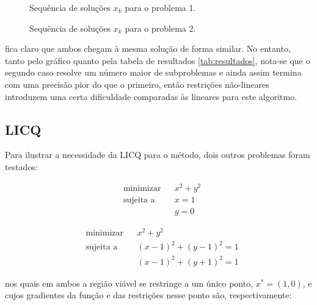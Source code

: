 	\noindent\begin{figure}[h!]
		\noindent\begin{minipage}[l]{.45\linewidth}
			\scalebox{.7}{}
			\caption{Sequência de soluções $x_k$ para o problema 1.}
		\end{minipage}%
		\hspace{0.1\linewidth}%
		\begin{minipage}[l]{.45\linewidth}
			\scalebox{.7}{}
			\caption{Sequência de soluções $x_k$ para o problema 2.}
		\end{minipage}
	\end{figure}

	fica claro que ambos chegam à mesma solução de forma similar. No entanto, tanto pelo gráfico
	quanto pela tabela de resultados \ref{tab:resultados}, nota-se que o segundo caso resolve um número
	maior de subproblemas e ainda assim termina com uma precisão pior do que o primeiro,
	então restrições não-lineares introduzem uma certa dificuldade comparadas às
	lineares para este algoritmo.

\subsection{LICQ}
	Para ilustrar a necessidade da LICQ para o método, dois outros problemas
	foram testados:

	\noindent\begin{minipage}{.5\linewidth}
		\begin{equation*}
			\begin{aligned}
				& \text{minimizar} & & x^2 + y^2 \\
				& \text{sujeita a} & & x = 1 \\
				&  & & y = 0
			\end{aligned}
		\end{equation*}
	\end{minipage}%
	\begin{minipage}{.5\linewidth}
		\begin{equation*}
			\begin{aligned}
				& \text{minimizar} & & x^2 + y^2 \\
				& \text{sujeita a} & & (x-1)^2+(y-1)^2 = 1 \\
				&  & & (x-1)^2+(y+1)^2 = 1
			\end{aligned}
		\end{equation*}
	\end{minipage}

	nos quais em ambos a região viável se restringe a um único ponto, $x^* = (1, 0)$,
	e cujos gradientes da função e das restrições nesse ponto são, respectivamente:

